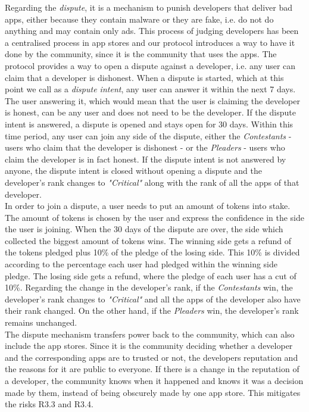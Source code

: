 Regarding the \textit{dispute}, it is a mechanism to punish developers that deliver bad apps, either because they contain malware or they are fake, i.e. do not do anything and may contain only ads. This process of judging developers has been a centralised process in app stores and our protocol introduces a way to have it done by the community, since it is the community that uses the apps. The protocol provides a way to open a dispute against a developer, i.e. any user can claim that a developer is dishonest. When a dispute is started, which at this point we call as a \textit{dispute intent}, any user can answer it within the next 7 days. The user answering it, which would mean that the user is claiming the developer is honest, can be any user and does not need to be the developer. If the dispute intent is answered, a dispute is opened and stays open for 30 days. Within this time period, any user can join any side of the dispute, either the \textit{Contestants} - users who claim that the developer is dishonest - or the \textit{Pleaders} - users who claim the developer is in fact honest. If the dispute intent is not answered by anyone, the dispute intent is closed without opening a dispute and the developer's rank changes to \textit{"Critical"} along with the rank of all the apps of that developer. \\

In order to join a dispute, a user needs to put an amount of tokens into stake. The amount of tokens is chosen by the user and express the confidence in the side the user is joining. When the 30 days of the dispute are over, the side which collected the biggest amount of tokens wins. The winning side gets a refund of the tokens pledged plus 10\% of the pledge of the losing side. This 10\% is divided according to the percentage each user had pledged within the winning side pledge. The losing side gets a refund, where the pledge of each user has a cut of 10\%. Regarding the change in the developer's rank, if the \textit{Contestants} win, the developer's rank changes to \textit{"Critical"} and all the apps of the developer also have their rank changed. On the other hand, if the \textit{Pleaders} win, the developer's rank remains unchanged. \\

The dispute mechanism transfers power back to the community, which can also include the app stores. Since it is the community deciding whether a developer and the corresponding apps are to trusted or not, the developers reputation and the reasons for it are public to everyone. If there is a change in the reputation of a developer, the community knows when it happened and knows it was a decision made by them, instead of being obscurely made by one app store. This mitigates the risks \textsf{R3.3} and \textsf{R3.4}. \\

